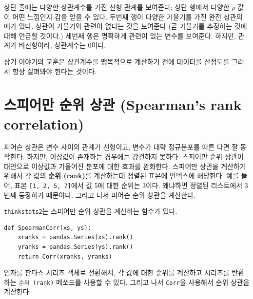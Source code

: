 상단 줄에는 다양한 상관계수를 가진 선형 관계를 보여준다; 상단 행에서 다양한 $\rho$ 값이 어떤 느낌인지 감을 얻을 수 있다.
두번째 행이 다양한 기울기를 가진 완전 상관의 예가 있다. 상관이 기울기와 관련이 없다는 것을 보여준다 (곧 기울기를 추정하는 것에 대해 언급할 것이다.) 세번째 행은 명확하게 관련이 있는 변수를 보여준다. 하지만, 관계가 비선형이라, 상관계수는 0이다.


상기 이야기의 교훈은 상관계수를 맹목적으로 계산하기 전에 데이터를 산점도를 그려서 항상 살펴봐야 한다는 것이다.



\section{스피어만 순위 상관 (Spearman's rank correlation)}

피어슨 상관은 변수 사이의 관계가 선형이고, 변수가 대략 정규분포를 따른 다면 잘 동작한다. 하지만, 이상값이 존재하는 경우에는 강건하지 못하다.
스피어만 순위 상관이 대안으로 이상값과 기울어진 분포에 대한 효과를 완화한다. 
스피어만 상관을 계산하기 위해서 각 값의 {\bf 순위 (rank)}를 계산하는데 정렬된 표본에 인덱스에 해당한다.
예를 들어, 표본 {\tt [1, 2, 5, 7]}에서 값 5에 대한 순위는 3이다. 왜냐하면 정렬된 리스트에서 3번째 등장하기 때문이다. 그리고 나서 피어슨 순위 상관을 계산한다.


{\tt thinkstats2}는 스피어만 순위 상관을 계산하는 함수가 있다.

\begin{verbatim}
def SpearmanCorr(xs, ys):
    xranks = pandas.Series(xs).rank()
    yranks = pandas.Series(ys).rank()
    return Corr(xranks, yranks)
\end{verbatim}

인자를 판다스 시리즈 객체로 전환해서, 각 값에 대한 순위를 계산하고 시리즈를 반환하는 {\tt 순위 (rank)} 메쏘드를 사용할 수 있다. 
그리고 나서 {\tt Corr}을 사용해서 순위 상관을 계산한다.


